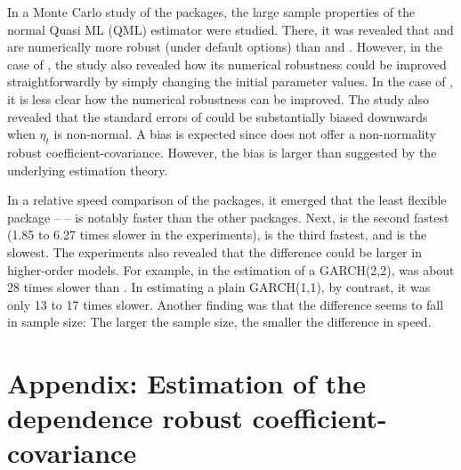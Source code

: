 In a Monte Carlo study of the packages, the large sample properties of the normal Quasi ML (QML) estimator were studied. There, it was revealed that  and  are numerically more robust (under default options) than  and . However, in the case of , the study also revealed how its numerical robustness could be improved straightforwardly by simply changing the initial parameter values. In the case of , it is less clear how the numerical robustness can be improved. The study also revealed that the standard errors of  could be substantially biased downwards when $\eta_t$ is non-normal. A bias is expected since  does not offer a non-normality robust coefficient-covariance. However, the bias is larger than suggested by the underlying estimation theory.

In a relative speed comparison of the packages, it emerged that the least flexible package --  -- is notably faster than the other packages. Next,  is the second fastest (1.85 to 6.27 times slower in the experiments),  is the third fastest, and  is the slowest. The experiments also revealed that the difference could be larger in higher-order models. For example, in the estimation of a GARCH(2,2),  was about 28 times slower than . In estimating a plain GARCH(1,1), by contrast, it was only 13 to 17 times slower. Another finding was that the difference seems to fall in sample size: The larger the sample size, the smaller the difference in speed.
 


\address{Genaro Sucarrat\\
  BI Norwegian Business School\\
  Nydalsveien 37\\
  0484 Oslo\\
  Norway\\
  }

\section{Appendix: Estimation of the dependence robust coefficient-covariance}


